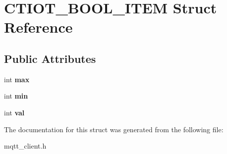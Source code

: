 \hypertarget{struct_c_t_i_o_t___b_o_o_l___i_t_e_m}{}\section{C\+T\+I\+O\+T\+\_\+\+B\+O\+O\+L\+\_\+\+I\+T\+EM Struct Reference}
\label{struct_c_t_i_o_t___b_o_o_l___i_t_e_m}
\subsection*{Public Attributes}
\begin{DoxyCompactItemize}
\item 
\mbox{\label{struct_c_t_i_o_t___b_o_o_l___i_t_e_m_a7fdf25bdc7f3224212a7953edd91b870}} 
int {\bfseries max}
\item 
\mbox{\label{struct_c_t_i_o_t___b_o_o_l___i_t_e_m_aeaf0f1bf6edf155473c3c73da8e34a8c}} 
int {\bfseries min}
\item 
\mbox{\label{struct_c_t_i_o_t___b_o_o_l___i_t_e_m_aee6b51a9fc5c55bd4b491d6c824d87f7}} 
int {\bfseries val}
\end{DoxyCompactItemize}


The documentation for this struct was generated from the following file\+:\begin{DoxyCompactItemize}
\item 
mqtt\+\_\+client.\+h\end{DoxyCompactItemize}
